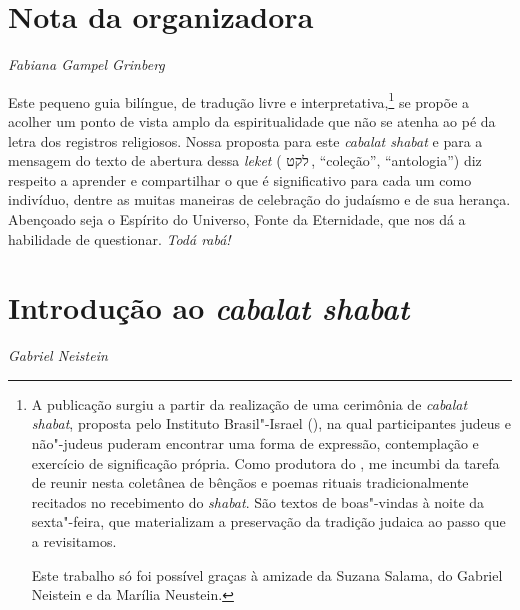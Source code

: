 

\chapter*{Nota da organizadora}


\begin{flushright}
\emph{Fabiana Gampel Grinberg}
\end{flushright}


Este pequeno guia bilíngue, de tradução livre e interpretativa,\footnote{ 
	A publicação surgiu a partir da realização de uma cerimônia de 
	\emph{cabalat shabat}, proposta pelo Instituto Brasil"-Israel (), na qual participantes judeus e não"-judeus puderam encontrar uma forma de expressão, contemplação e exercício de significação própria. Como produtora do , me incumbi da tarefa de reunir nesta coletânea de bênçãos e poemas rituais tradicionalmente recitados no recebimento do \emph{shabat}. São textos de boas"-vindas à noite da sexta"-feira, que materializam a preservação da tradição judaica ao passo que a revisitamos.

	Este trabalho só foi possível graças à amizade da Suzana Salama, do Gabriel Neistein e da Marília Neustein.} 
 se propõe a acolher um ponto de vista amplo da espiritualidade que não se atenha ao pé da letra dos registros religiosos. Nossa proposta para este \emph{cabalat shabat} e  para a mensagem do texto de abertura dessa \emph{leket} ( {לקט}\,, ``coleção'', ``antologia'') diz respeito a aprender e compartilhar o que é significativo para cada um como indivíduo, dentre as muitas maneiras de celebração do judaísmo e de sua herança. {Abençoado seja o Espírito do Universo, Fonte da Eternidade, que nos dá a habilidade de questionar}.
\emph{Todá rabá!}


\chapter*{Introdução ao \emph{cabalat shabat}}


\begin{flushright}
\emph{Gabriel Neistein}
\end{flushright}

